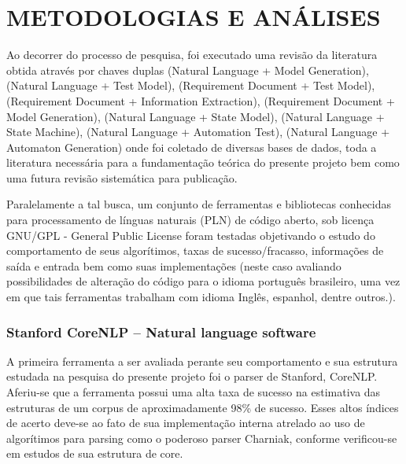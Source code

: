 \chapter{METODOLOGIAS E ANÁLISES}
\label{cap:metodologias e analises}

Ao decorrer do processo de pesquisa, foi executado uma revisão da literatura obtida através por chaves duplas {(Natural Language + Model Generation), (Natural Language + Test Model), (Requirement Document + Test Model), (Requirement Document + Information Extraction), (Requirement Document + Model Generation), (Natural Language + State Model), (Natural Language + State Machine), (Natural Language + Automation Test), (Natural Language + Automaton Generation)} onde foi coletado de diversas bases de dados, toda a literatura necessária para a fundamentação teórica do presente projeto bem como uma futura revisão sistemática para publicação.

Paralelamente a tal busca, um conjunto de ferramentas e bibliotecas conhecidas para processamento de línguas naturais (PLN) de código aberto, sob licença GNU/GPL - General Public License foram testadas objetivando o estudo do comportamento de seus algorítimos, taxas de sucesso/fracasso, informações de saída e entrada bem como suas implementações (neste caso avaliando possibilidades de alteração do código para o idioma português brasileiro, uma vez em que tais ferramentas trabalham com idioma Inglês, espanhol, dentre outros.).

\subsection{Stanford CoreNLP – Natural language software}
A primeira ferramenta a ser avaliada perante seu comportamento e sua estrutura estudada na pesquisa do presente projeto foi o parser de Stanford, CoreNLP. Aferiu-se que a ferramenta possui uma alta taxa de sucesso na estimativa das estruturas de um corpus de aproximadamente 98\% de sucesso. Esses altos índices de acerto deve-se ao fato de sua implementação interna atrelado ao uso de algorítimos para parsing como o poderoso parser Charniak, conforme verificou-se em estudos de sua estrutura de core.

